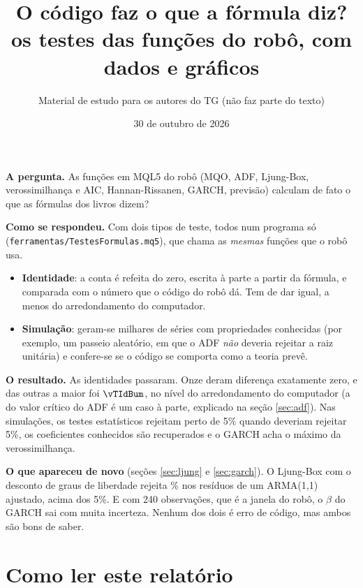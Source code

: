 \documentclass[11pt,a4paper]{article}
\title{\textbf{O código faz o que a fórmula diz?}\\[2pt]\large os testes das funções do robô, com dados e gráficos}
\author{Material de estudo para os autores do TG (não faz parte do texto)}
\date{30 de outubro de 2026}
\begin{document}
\maketitle

\begin{ideia}
\textbf{A pergunta.} As funções em MQL5 do robô (MQO, ADF, Ljung-Box, verossimilhança e AIC, Hannan-Rissanen,
GARCH, previsão) calculam de fato o que as fórmulas dos livros dizem?

\textbf{Como se respondeu.} Com dois tipos de teste, todos num programa só
(\texttt{ferramentas/TestesFormulas.mq5}), que chama as \emph{mesmas} funções que o robô usa.
\begin{itemize}[nosep,leftmargin=1.2em]
\item \textbf{Identidade}: a conta é refeita do zero, escrita à parte a partir da fórmula, e comparada com o
número que o código do robô dá. Tem de dar igual, a menos do arredondamento do computador.
\item \textbf{Simulação}: geram-se milhares de séries com propriedades conhecidas (por exemplo, um passeio
aleatório, em que o ADF \emph{não} deveria rejeitar a raiz unitária) e confere-se se o código se comporta como
a teoria prevê.
\end{itemize}

\textbf{O resultado.} As \vTNumIdent{} identidades passaram. Onze deram diferença exatamente zero, e das outras a
maior foi $\vTIdBum$, no nível do arredondamento do computador (a do valor crítico do ADF é um caso à parte,
explicado na seção \ref{sec:adf}). Nas simulações, os testes estatísticos rejeitam perto de 5\% quando deveriam rejeitar
5\%, os coeficientes conhecidos são recuperados e o GARCH acha o máximo da verossimilhança.

\textbf{O que apareceu de novo} (seções \ref{sec:ljung} e \ref{sec:garch}). O Ljung-Box com o desconto de
graus de liberdade rejeita \vTLbArmaCom\% nos resíduos de um ARMA(1,1) ajustado, acima dos 5\%. E com 240
observações, que é a janela do robô, o $\beta$ do GARCH sai com muita incerteza. Nenhum dos dois é erro de
código, mas ambos são bons de saber.
\end{ideia}

\tableofcontents

\section{Como ler este relatório}
\end{document}

